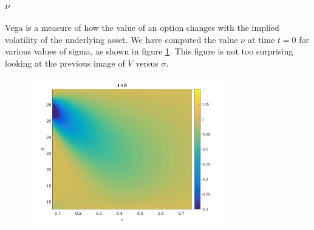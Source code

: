   \subsubsection{$\nu$}
  Vega is a measure of how the value of an option changes with the implied volatility of the underlying asset. We have computed the value $\nu$ at time $t=0$ for various
  values of sigma, as shown in figure \ref{fig:nu}. This figure is not too surprising looking at the previous image of $V$ versus $\sigma$.
  \begin{figure}[hhp!]
    \caption{}
    \label{fig:nu}
    \centering
      \includegraphics[width=0.75\textwidth]{plots/vega_field_sigma}
  \end{figure}



